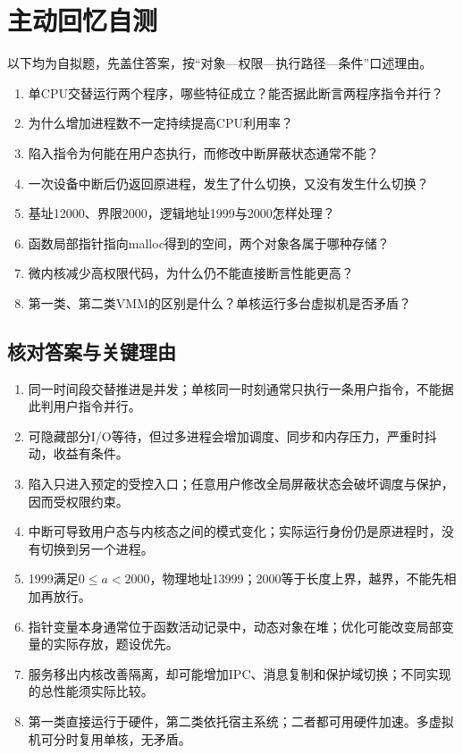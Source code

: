 \section{主动回忆自测}\label{OS01-recall}

以下均为自拟题，先盖住答案，按``对象---权限---执行路径---条件''口述理由。

\begin{recallcard}[从七个主枝提取机制]

\begin{enumerate}
\def\labelenumi{\arabic{enumi}.}
\tightlist
\item
  单CPU交替运行两个程序，哪些特征成立？能否据此断言两程序指令并行？
\item
  为什么增加进程数不一定持续提高CPU利用率？
\item
  陷入指令为何能在用户态执行，而修改中断屏蔽状态通常不能？
\item
  一次设备中断后仍返回原进程，发生了什么切换，又没有发生什么切换？
\item
  基址12000、界限2000，逻辑地址1999与2000怎样处理？
\item
  函数局部指针指向malloc得到的空间，两个对象各属于哪种存储？
\item
  微内核减少高权限代码，为什么仍不能直接断言性能更高？
\item
  第一类、第二类VMM的区别是什么？单核运行多台虚拟机是否矛盾？
\end{enumerate}

\end{recallcard}

\subsection{核对答案与关键理由}\label{OS01-recall-answers}

\begin{enumerate}
\def\labelenumi{\arabic{enumi}.}
\tightlist
\item
  同一时间段交替推进是并发；单核同一时刻通常只执行一条用户指令，不能据此判用户指令并行。
\item
  可隐藏部分I/O等待，但过多进程会增加调度、同步和内存压力，严重时抖动，收益有条件。
\item
  陷入只进入预定的受控入口；任意用户修改全局屏蔽状态会破坏调度与保护，因而受权限约束。
\item
  中断可导致用户态与内核态之间的模式变化；实际运行身份仍是原进程时，没有切换到另一个进程。
\item
  1999满足\(0\le a<2000\)，物理地址13999；2000等于长度上界，越界，不能先相加再放行。
\item
  指针变量本身通常位于函数活动记录中，动态对象在堆；优化可能改变局部变量的实际存放，题设优先。
\item
  服务移出内核改善隔离，却可能增加IPC、消息复制和保护域切换；不同实现的总性能须实际比较。
\item
  第一类直接运行于硬件，第二类依托宿主系统；二者都可用硬件加速。多虚拟机可分时复用单核，无矛盾。
\end{enumerate}

